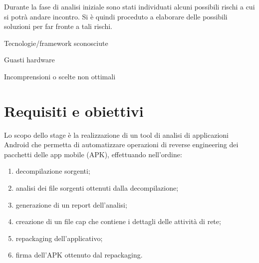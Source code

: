 Durante la fase di analisi iniziale sono stati individuati alcuni possibili rischi a cui si potrà andare incontro.
Si è quindi proceduto a elaborare delle possibili soluzioni per far fronte a tali rischi.\\

\begin{risk}{Tecnologie/framework sconosciute}
    \label{risk:tecnologie-framework-sconosciute}
\end{risk}
\begin{risk}{Guasti hardware}
    \label{risk:guasti-hardware}
\end{risk}
\begin{risk}{Incomprensioni o scelte non ottimali}
    \label{risk:incomprensioni-o-scelte-non-ottimali}
\end{risk}

\section{Requisiti e obiettivi}\label{sec:requisiti-e-obiettivi}
Lo scopo dello stage è la realizzazione di un tool di analisi di applicazioni Android che permetta di automatizzare operazioni di reverse engineering dei pacchetti delle app mobile (APK), effettuando nell'ordine:
\begin{enumerate}
    \setlength\itemsep{0.1em}
    \item decompilazione sorgenti;
    \item analisi dei file sorgenti ottenuti dalla decompilazione;
    \item generazione di un report dell'analisi;
    \item creazione di un file \gls{cap} che contiene i dettagli delle attività di rete;
    \item repackaging dell'applicativo;
    \item firma dell'APK ottenuto dal repackaging.
\end{enumerate}

